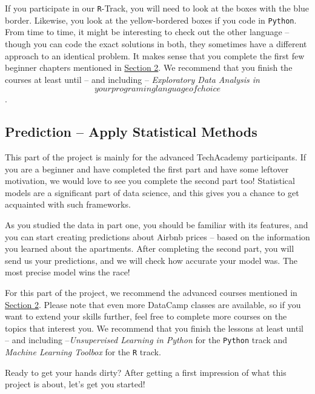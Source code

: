\documentclass[
  11pt,
]{article}
\begin{document}
If you participate in our \texttt{R}-Track, you will need to look at the boxes with the blue border.
Likewise, you look at the yellow-bordered boxes if you code in \texttt{Python}.
From time to time, it might be interesting to check out the other language -- though you can code the exact solutions in both, they sometimes have a different approach to an identical problem.
It makes sense that you complete the first few beginner chapters mentioned in \href{https://tech-academy-ev.github.io/whats-data-science-and-how-do-i-do-it.html\#whats-data-science-and-how-do-i-do-it}{Section 2}.
We recommend that you finish the courses at least until -- and including -- \emph{Exploratory Data Analysis in \[your programing language of choice\]}.

\hypertarget{prediction-apply-statistical-methods}{%
\subsection{Prediction -- Apply Statistical Methods}\label{prediction-apply-statistical-methods}}

This part of the project is mainly for the advanced TechAcademy participants.
If you are a beginner and have completed the first part and have some leftover motivation, we would love to see you complete the second part too!
Statistical models are a significant part of data science, and this gives you a chance to get acquainted with such frameworks.

As you studied the data in part one, you should be familiar with its features, and you can start creating predictions about Airbnb prices -- based on the information you learned about the apartments.
After completing the second part, you will send us your predictions, and we will check how accurate your model was.
The most precise model wins the race!

For this part of the project, we recommend the advanced courses mentioned in \href{https://tech-academy-ev.github.io/whats-data-science-and-how-do-i-do-it.html\#whats-data-science-and-how-do-i-do-it}{Section 2}.
Please note that even more DataCamp classes are available, so if you want to extend your skills further, feel free to complete more courses on the topics that interest you.
We recommend that you finish the lessons at least until -- and including --\emph{Unsupervised Learning in Python} for the \texttt{Python} track and \emph{Machine Learning Toolbox} for the \texttt{R} track.

Ready to get your hands dirty?
After getting a first impression of what this project is about, let's get you started!
\end{document}
